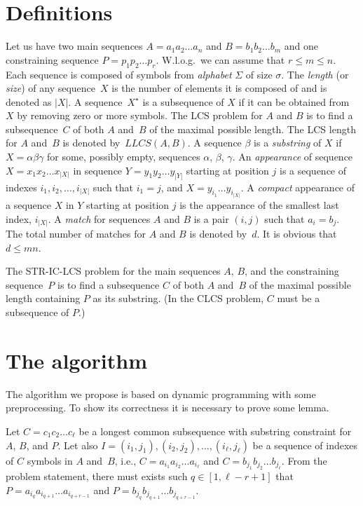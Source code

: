 \documentclass[12pt]{article}
\begin{document}
\section{Definitions}
\label{sec:defs}
Let us have two main sequences $A = a_1 a_2 \ldots a_n$ and $B = b_1 b_2 \ldots b_m$ and one constraining sequence $P = p_1 p_2 \ldots p_r$.
W.l.o.g.\ we can assume that $r \le m \le n$.
Each sequence is composed of symbols from \emph{alphabet} $\Sigma$ of size $\sigma$.
The \emph{length} (or \emph{size}) of any sequence~$X$ is the number of elements it is composed of and is denoted as $|X|$.
A sequence~$X^\star$ is a subsequence of $X$ if it can be obtained from $X$ by removing zero or more symbols.
The LCS problem for $A$ and $B$ is to find a subsequence~$C$ of both $A$ and~$B$ of the maximal possible length.
The LCS length for $A$ and~$B$ is denoted by~$\mathit{LLCS}(A, B)$.
A sequence $\beta$ is a \emph{substring} of $X$ if $X = \alpha \beta \gamma$ for some, possibly empty, sequences $\alpha$, $\beta$, $\gamma$.
An \emph{appearance} of sequence $X = x_1 x_2\ldots x_{|X|}$ in sequence $Y = y_1 y_2 \ldots y_{|Y|}$ starting at position $j$ is a sequence of indexes $i_1, i_2, \ldots, i_{|X|}$ such that $i_1 = j$, and $X = y_{i_1} \ldots y_{i_{|X|}}$.
A \emph{compact} appearance of a sequence $X$ in $Y$ starting at position $j$ is the appearance of the smallest last index, $i_{|X|}$.
A \emph{match} for sequences $A$ and $B$ is a pair $(i, j)$ such that $a_i = b_j$.
The total number of matches for $A$ and $B$ is denoted by~$d$.
It is obvious that $d \le mn$.

The STR-IC-LCS problem for the main sequences $A$, $B$, and the constraining sequence~$P$ is to find a subsequence $C$ of both $A$ and~$B$ of the maximal possible length containing $P$ as its substring.
(In the CLCS problem, $C$ must be a subsequence of $P$.)


\section{The algorithm}
\label{sec:alg}
The algorithm we propose is based on dynamic programming with some preprocessing.
To show its correctness it is necessary to prove some lemma.

Let $C = c_1 c_2 \ldots c_\ell$ be a longest common subsequence with substring constraint for $A$, $B$, and $P$.
Let also $I = (i_1, j_1), (i_2, j_2), \ldots, (i_\ell, j_\ell)$ be a sequence of indexes of $C$ symbols in $A$ and~$B$, i.e., $C = a_{i_1} a_{i_2} \ldots a_{i_\ell}$ and $C = b_{j_1} b_{j_2} \ldots b_{j_\ell}$.
From the problem statement, there must exists such $q \in [1, \ell-r+1]$ that $P = a_{i_q} a_{i_{q+1}} \ldots a_{i_{q+r-1}}$ and  $P = b_{j_q} b_{j_{q+1}} \ldots b_{j_{q+r-1}}$.
\end{document}
